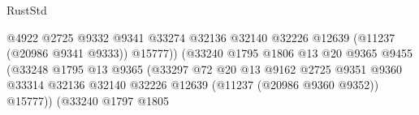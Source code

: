 \begin{lexlean}{RustStd}
\begin{coremodule}
                                                          @4922
                                                          @2725
                                                          @9332
                                                          @9341
                                                          @33274
                                                          @32136
                                                          @32140
                                                          @32226
                                                          @12639
                                                          (@11237 (@20986 @9341 @9333))
                                                          @15777))
                                                      (@33240
                                                        @1795
                                                        @1806
                                                        @13
                                                        @20
                                                        @9365
                                                        @9455
                                                        (@33248
                                                          @1795
                                                          @13
                                                          @9365
                                                          (@33297
                                                            @72
                                                            @20
                                                            @13
                                                            @9162
                                                            @2725
                                                            @9351
                                                            @9360
                                                            @33314
                                                            @32136
                                                            @32140
                                                            @32226
                                                            @12639
                                                            (@11237 (@20986 @9360 @9352))
                                                            @15777))
                                                        (@33240
                                                          @1797
                                                          @1805

\end{coremodule}
\end{lexlean}
